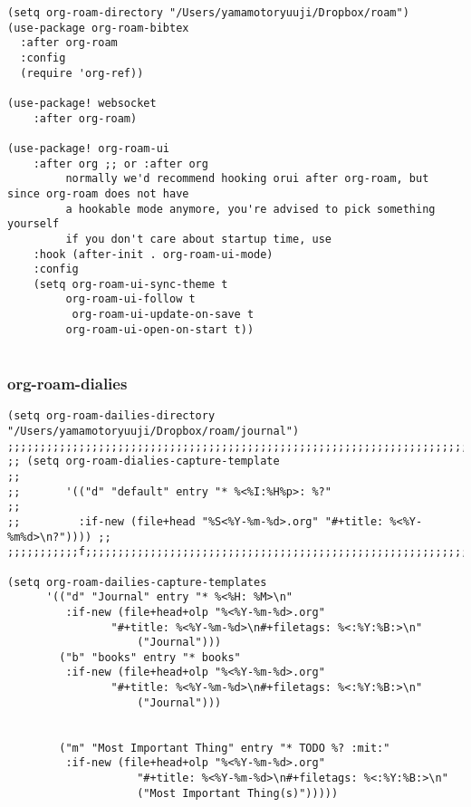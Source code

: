 \documentclass[11pt]{article}
\begin{document}
\begin{verbatim}
(setq org-roam-directory "/Users/yamamotoryuuji/Dropbox/roam")
(use-package org-roam-bibtex
  :after org-roam
  :config
  (require 'org-ref))

(use-package! websocket
    :after org-roam)

(use-package! org-roam-ui
    :after org ;; or :after org
         normally we'd recommend hooking orui after org-roam, but since org-roam does not have
         a hookable mode anymore, you're advised to pick something yourself
         if you don't care about startup time, use
    :hook (after-init . org-roam-ui-mode)
    :config
    (setq org-roam-ui-sync-theme t
         org-roam-ui-follow t
          org-roam-ui-update-on-save t
         org-roam-ui-open-on-start t))


\end{verbatim}
\subsubsection{org-roam-dialies}
\label{sec:org45030ed}
\begin{verbatim}
(setq org-roam-dailies-directory "/Users/yamamotoryuuji/Dropbox/roam/journal")
;;;;;;;;;;;;;;;;;;;;;;;;;;;;;;;;;;;;;;;;;;;;;;;;;;;;;;;;;;;;;;;;;;;;;;;;;;;;;;;;
;; (setq org-roam-dialies-capture-template                                    ;;
;;       '(("d" "default" entry "* %<%I:%H%p>: %?"                            ;;
;;         :if-new (file+head "%S<%Y-%m-%d>.org" "#+title: %<%Y-%m%d>\n?")))) ;;
;;;;;;;;;;;f;;;;;;;;;;;;;;;;;;;;;;;;;;;;;;;;;;;;;;;;;;;;;;;;;;;;;;;;;;;;;;;;;;;;

(setq org-roam-dailies-capture-templates
      '(("d" "Journal" entry "* %<%H: %M>\n"
         :if-new (file+head+olp "%<%Y-%m-%d>.org"
  	  	        "#+title: %<%Y-%m-%d>\n#+filetags: %<:%Y:%B:>\n"
		  	        ("Journal")))
        ("b" "books" entry "* books"
         :if-new (file+head+olp "%<%Y-%m-%d>.org"
  	  	        "#+title: %<%Y-%m-%d>\n#+filetags: %<:%Y:%B:>\n"
		  	        ("Journal")))


        ("m" "Most Important Thing" entry "* TODO %? :mit:"
         :if-new (file+head+olp "%<%Y-%m-%d>.org"
			        "#+title: %<%Y-%m-%d>\n#+filetags: %<:%Y:%B:>\n"
			        ("Most Important Thing(s)")))))


\end{verbatim}
\end{document}
